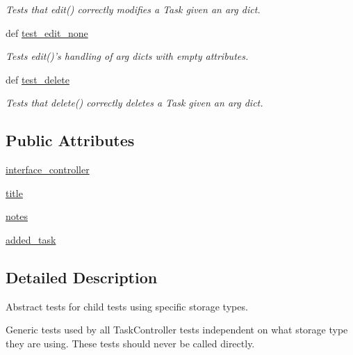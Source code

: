 \begin{DoxyCompactItemize}
\begin{DoxyCompactList}\small\item\em \-Tests that edit() correctly modifies a \-Task given an arg dict. \end{DoxyCompactList}\item 
def \hyperlink{classtest__taskcontroller_1_1TestTaskController_ac5d4cb8d40e6976c97f7bd9f0d0e5dc4}{test\-\_\-edit\-\_\-none}
\begin{DoxyCompactList}\small\item\em \-Tests edit()'s handling of arg dicts with empty attributes. \end{DoxyCompactList}\item 
def \hyperlink{classtest__taskcontroller_1_1TestTaskController_a2bf53edfdfd95abe028ce4ada0644263}{test\-\_\-delete}
\begin{DoxyCompactList}\small\item\em \-Tests that delete() correctly deletes a \-Task given an arg dict. \end{DoxyCompactList}\end{DoxyCompactItemize}
\subsection*{\-Public \-Attributes}
\begin{DoxyCompactItemize}
\item 
\hyperlink{classtest__taskcontroller_1_1TestTaskController_a16cbd17e4ad8bf93e164813b77313942}{interface\-\_\-controller}
\item 
\hyperlink{classtest__taskcontroller_1_1TestTaskController_a450431cde03f14169cd5ac04db704ab6}{title}
\item 
\hyperlink{classtest__taskcontroller_1_1TestTaskController_a9825f47dfebf3e25f03548d51d1d07d1}{notes}
\item 
\hyperlink{classtest__taskcontroller_1_1TestTaskController_a8b748405763b73406ca9cfafe467c0a1}{added\-\_\-task}
\end{DoxyCompactItemize}


\subsection{\-Detailed \-Description}
\-Abstract tests for child tests using specific storage types. 

\-Generic tests used by all \-Task\-Controller tests independent on what storage type they are using. \-These tests should never be called directly. 

